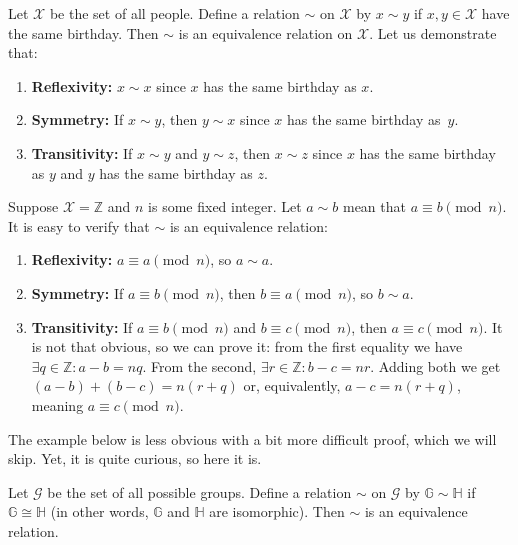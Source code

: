\documentclass[../../book.tex]{subfiles}
\begin{document}
\begin{example}
    Let $\mathcal{X}$ be the set of all people. Define a relation $\sim$ on $\mathcal{X}$ by $x \sim y$ if $x,y \in \mathcal{X}$ have the same birthday. 
    Then $\sim$ is an equivalence relation on $\mathcal{X}$. Let us demonstrate that:
    \begin{enumerate}
        \item \textbf{Reflexivity:} $x \sim x$ since $x$ has the same birthday as $x$.
        \item \textbf{Symmetry:} If $x \sim y$, then $y \sim x$ since $x$ has the same birthday as~$y$.
        \item \textbf{Transitivity:} If $x \sim y$ and $y \sim z$, then $x \sim z$ since $x$ has the same birthday as $y$ and $y$ has the same birthday as $z$.
    \end{enumerate}
\end{example}

\begin{example}
    Suppose $\mathcal{X} = \mathbb{Z}$ and $n$ is some fixed integer. Let $a \sim b$ mean that $a \equiv b \pmod{n}$. It is easy to verify that $\sim$ is an equivalence relation:
    \begin{enumerate}
        \item \textbf{Reflexivity:} $a \equiv a \pmod{n}$, so $a \sim a$.
        \item \textbf{Symmetry:} If $a \equiv b \pmod{n}$, then $b \equiv a \pmod{n}$, so $b \sim a$.
        \item \textbf{Transitivity:} If $a \equiv b \pmod{n}$ and $b \equiv c \pmod{n}$, then $a \equiv c \pmod{n}$. It is not that obvious, so we can prove it: from the first equality we have $\exists q \in \mathbb{Z}: a-b = nq$. From the second, $\exists r \in \mathbb{Z}: b-c = nr$. Adding both we get $(a-b)+(b-c) = n(r+q)$ or, equivalently, $a-c = n(r+q)$, meaning $a \equiv c \pmod{n}$.
    \end{enumerate}
\end{example}

The example below is less obvious with a bit more difficult proof, which we will skip. Yet, it is quite curious, so here it is.

\begin{example}
    Let $\mathcal{G}$ be the set of all possible groups. Define a relation $\sim$ on $\mathcal{G}$ by $\mathbb{G} \sim \mathbb{H}$ if $\mathbb{G} \cong \mathbb{H}$ (in other words, $\mathbb{G}$ and $\mathbb{H}$ are isomorphic). Then $\sim$ is an equivalence relation.
\end{example}
\end{document}

